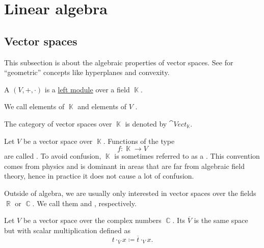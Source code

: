 \section{Linear algebra}\label{sec:linear_algebra}
\subsection{Vector spaces}\label{subsec:vector_spaces}

This subsection is about the algebraic properties of vector spaces. See  for \enquote{geometric} concepts like hyperplanes and convexity.

\begin{definition}\label{def:vector_space}
  A  \( (V, +, \cdot) \) is a \hyperref[def:left_module]{left module} over a field \( \BbbK \).

  We call elements of \( \BbbK \)  and elements of \( V \) .

  The category of vector spaces over \( \BbbK \) is denoted by \( \cat{Vect}_{\BbbK} \).
\end{definition}

\begin{definition}\label{def:vector_field}
  Let \( V \) be a vector space over \( \BbbK \). Functions of the type
  \begin{equation*}
    f: \BbbK \to V
  \end{equation*}
  are called . To avoid confusion, \( \BbbK \) is sometimes referred to as a . This convention comes from physics and is dominant in areas that are far from algebraic field theory, hence in practice it does not cause a lot of confusion.
\end{definition}

\begin{remark}\label{rem:real_vector_space}
  Outside of algebra, we are usually only interested in vector spaces over the fields \( \BbbR \) or \( \BbbC \). We call them  and , respectively.
\end{remark}

\begin{definition}\label{def:complex_conjucate_vector_space}
  Let \( V \) be a vector space over the complex numbers \( \BbbC \). Its  \( \overline V \) is the same space but with scalar multiplication defined as
  \begin{equation*}
    t \cdot_{\overline V} x \coloneqq \overline t \cdot_V x.
  \end{equation*}
\end{definition}

